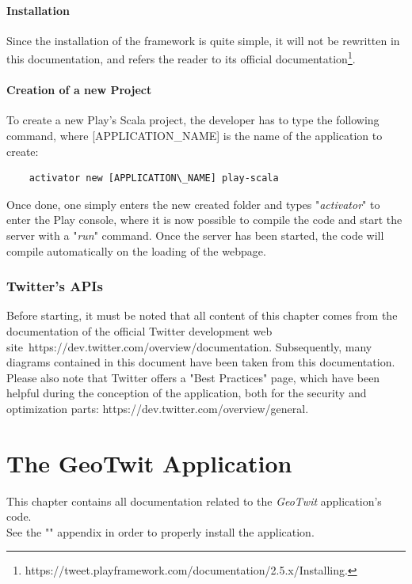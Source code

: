 \documentclass[a4paper,11pt]{report}
\begin{document}
\subsubsection{Installation}
Since the installation of the framework is quite simple, it will not be rewritten in this documentation, and refers the reader to its official documentation\footnote{https://tweet.playframework.com/documentation/2.5.x/Installing.}.

\subsubsection{Creation of a new Project}
To create a new Play's Scala project, the developer has to type the following command, where [APPLICATION\_NAME] is the name of the application to create:
\begin{lstlisting}
	activator new [APPLICATION\_NAME] play-scala
\end{lstlisting}
Once done, one simply enters the new created folder and types "\emph{activator}" to enter the Play console, where it is now possible to compile the code and start the server with a "\emph{run}" command. Once the server has been started, the code will compile automatically on the loading of the webpage.

\subsection{Twitter's APIs}
Before starting, it must be noted that all content of this chapter comes from the documentation of the official Twitter development web site\ https://dev.twitter.com/overview/documentation. Subsequently, many diagrams contained in this document have been taken from this documentation.
Please also note that Twitter offers a "Best Practices" page, which have been helpful during the conception of the application, both for the security and optimization parts:  https://dev.twitter.com/overview/general.

\chapter{The GeoTwit Application}
This chapter contains all documentation related to the \emph{GeoTwit} application's code.\\
See the "\textsl{}" appendix in order to properly install the application.
\end{document}
